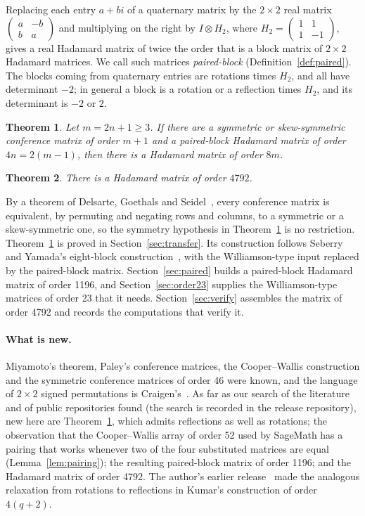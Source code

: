 \documentclass[10pt]{article}
\newtheorem{theorem}{Theorem}
\theoremstyle{definition}
\theoremstyle{remark}
\begin{document}
Replacing each entry $a+bi$ of a quaternary matrix by the $2\times2$ real matrix $\left(\begin{smallmatrix}a&-b\\ b&a\end{smallmatrix}\right)$ and multiplying on the right by $I\otimes H_2$, where $H_2=\left(\begin{smallmatrix}1&1\\1&-1\end{smallmatrix}\right)$, gives a real Hadamard matrix of twice the order that is a block matrix of $2\times2$ Hadamard matrices. We call such matrices \emph{paired-block} (Definition~\ref{def:paired}). The blocks coming from quaternary entries are rotations times $H_2$, and all have determinant $-2$; in general a block is a rotation or a reflection times $H_2$, and its determinant is $-2$ or $2$.

\begin{theorem}\label{thm:transfer}
Let $m=2n+1\ge3$. If there are a symmetric or skew-symmetric conference matrix of order $m+1$ and a paired-block Hadamard matrix of order $4n=2(m-1)$, then there is a Hadamard matrix of order $8m$.
\end{theorem}

\begin{theorem}\label{thm:4792}
There is a Hadamard matrix of order $4792$.
\end{theorem}

By a theorem of Delsarte, Goethals and Seidel~\cite[Corollary~2.2]{DGS71}, every conference matrix is equivalent, by permuting and negating rows and columns, to a symmetric or a skew-symmetric one, so the symmetry hypothesis in Theorem~\ref{thm:transfer} is no restriction. Theorem~\ref{thm:transfer} is proved in Section~\ref{sec:transfer}. Its construction follows Seberry and Yamada's eight-block construction~\cite[Lemma~8.12]{SY92}, with the Williamson-type input replaced by the paired-block matrix. Section~\ref{sec:paired} builds a paired-block Hadamard matrix of order 1196, and Section~\ref{sec:order23} supplies the Williamson-type matrices of order 23 that it needs. Section~\ref{sec:verify} assembles the matrix of order 4792 and records the computations that verify it.

\paragraph{What is new.} Miyamoto's theorem, Paley's conference matrices, the Cooper--Wallis construction and the symmetric conference matrices of order 46 were known, and the language of $2\times2$ signed permutations is Craigen's~\cite{Cr95}. As far as our search of the literature and of public repositories found (the search is recorded in the release repository), new here are Theorem~\ref{thm:transfer}, which admits reflections as well as rotations; the observation that the Cooper--Wallis array of order 52 used by SageMath has a pairing that works whenever two of the four substituted matrices are equal (Lemma~\ref{lem:pairing}); the resulting paired-block matrix of order 1196; and the Hadamard matrix of order 4792. The author's earlier release~\cite{Kl26} made the analogous relaxation from rotations to reflections in Kumar's construction of order $4(q+2)$.
\end{document}
